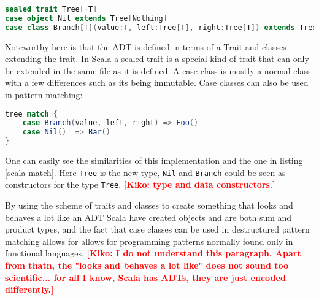 \documentclass[10pt]{report}
\newcommand{\KIKO}[1]{\textcolor{red}{\textbf{[Kiko: #1]}}}
\def\code#1{\texttt{#1}} %
\begin{document}
\begin{lstlisting}[language=Scala,caption={ADT definition in Scala},label={lst:e4c_syntax}]
sealed trait Tree[+T]
case object Nil extends Tree[Nothing]
case class Branch[T](value:T, left:Tree[T], right:Tree[T]) extends Tree[T]
\end{lstlisting}
\par{Noteworthy here is that the ADT is defined in terms of a Trait and classes extending the trait. In Scala a sealed trait is a special kind of trait that can only be extended in the same file as it is defined. A case class is mostly a normal class with a few differences such as its being immutable\cite{ScalaCase}. Case classes can also be used in pattern matching:}
\begin{lstlisting}[language=Scala,caption={Pattern matching on an ADT in Scala},label=scala-match]
tree match {
    case Branch(value, left, right) => Foo()
    case Nil()  => Bar()
}
\end{lstlisting}
\par{One can easily see the similarities of this implementation and the one in listing \ref{scala-match}. Here \code{Tree} is the new type, \code{Nil} and \code{Branch} could be seen as constructors for the type \code{Tree}. \KIKO{type and data constructors.}}
\par{By using the scheme of traits and classes to create something that looks and behaves a lot like an ADT Scala have created objects and are both sum and product types, and the fact that case classes can be used in destructured pattern matching allows for allows for programming patterns normally found only in functional languages. \KIKO{I do not understand this paragraph. Apart from thatn, the "looks and behaves a lot like" does not sound too scientific... for all I know, Scala has ADTs, they are just encoded differently.}}
\end{document}

